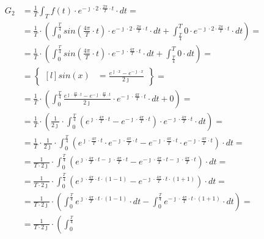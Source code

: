 \begin{task}
\begin{align*}
G_2&=\frac{1}{T}\int_{T}f(t) \cdot e^{-\jmath \cdot 2 \cdot \frac{2\pi}{T} \cdot t} \cdot dt=\\
&=\frac{1}{T}\cdot\left(\int_{0}^{\frac{T}{4}} sin\left( \frac{4\pi}{T} \cdot t\right) \cdot e^{-\jmath \cdot 2 \cdot \frac{2\pi}{T} \cdot t} \cdot dt+\int_{\frac{T}{4}}^{T} 0 \cdot e^{-\jmath \cdot 2 \cdot \frac{2\pi}{T} \cdot t} \cdot dt\right)=\\
&=\frac{1}{T}\cdot\left(\int_{0}^{\frac{T}{4}}sin\left( \frac{4\pi}{T} \cdot t\right) \cdot e^{-\jmath \cdot \frac{4\pi}{T} \cdot t} \cdot dt+\int_{\frac{T}{4}}^{T} 0 \cdot dt\right)=\\
&=\begin{Bmatrix*}[l]
sin\left(x\right)&=\frac{e^{\jmath \cdot x}-e^{-\jmath \cdot x}}{2 \jmath }
\end{Bmatrix*}=\\
&=\frac{1}{T}\cdot\left(\int_{0}^{\frac{T}{4}} \frac{e^{\jmath \cdot \frac{4\pi}{T} \cdot t}-e^{-\jmath \cdot \frac{4\pi}{T} \cdot t}}{2\jmath} \cdot e^{-\jmath \cdot \frac{4\pi}{T} \cdot t} \cdot dt+0\right)=\\
&=\frac{1}{T}\cdot\left(\frac{1}{2\jmath} \cdot \int_{0}^{\frac{T}{4}} \left(e^{\jmath \cdot \frac{4\pi}{T} \cdot t}-e^{-\jmath \cdot \frac{4\pi}{T} \cdot t}\right)\cdot e^{-\jmath \cdot \frac{4\pi}{T} \cdot t} \cdot dt\right)=\\
&=\frac{1}{T} \cdot \frac{1}{2\jmath} \cdot \int_{0}^{\frac{T}{4}}
\left( e^{\jmath \cdot \frac{4\pi}{T} \cdot t} \cdot e^{-\jmath \cdot \frac{4\pi}{T} \cdot t} - e^{-\jmath \cdot \frac{4\pi}{T} \cdot t} \cdot e^{-\jmath \cdot \frac{4\pi}{T} \cdot t} \right) \cdot dt=\\
&=\frac{1}{T\cdot 2\jmath} \cdot \int_{0}^{\frac{T}{4}}
\left(e^{\jmath \cdot \frac{4\pi}{T} \cdot t -\jmath \cdot \frac{4\pi}{T} \cdot t} - e^{-\jmath \cdot \frac{4\pi}{T} \cdot t -\jmath \cdot \frac{4\pi}{T} \cdot t} \right) \cdot dt=\\
&=\frac{1}{T\cdot 2\jmath} \cdot \int_{0}^{\frac{T}{4}}
\left(e^{\jmath \cdot \frac{4\pi}{T} \cdot t \cdot \left(1 - 1\right)} - e^{-\jmath \cdot \frac{4\pi}{T} \cdot t \cdot \left(1+1\right)} \right) \cdot dt=\\
&=\frac{1}{T\cdot 2\jmath} \cdot \left( \int_{0}^{\frac{T}{4}}
e^{\jmath \cdot \frac{4\pi}{T} \cdot t \cdot \left(1 - 1\right)} \cdot dt - \int_{0}^{\frac{T}{4}} e^{-\jmath \cdot \frac{4\pi}{T} \cdot t \cdot \left(1+1\right)} \cdot dt \right)=\\
&=\frac{1}{T\cdot 2\jmath} \cdot \left( \int_{0}^{\frac{T}{4}}

\end{align*}
\end{task}
